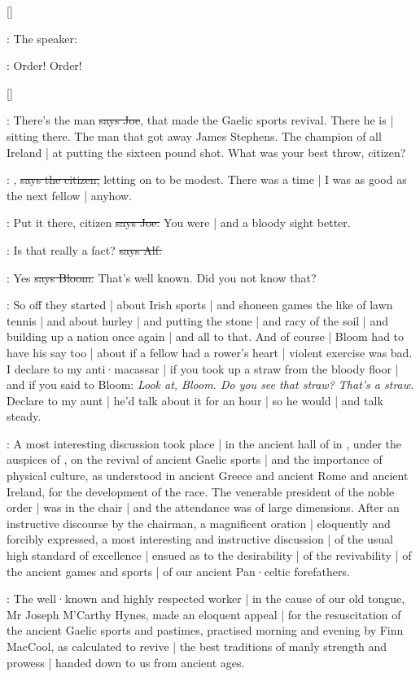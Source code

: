 []

:
The speaker:

\Speaker:
Order!
Order!

[]

\joe:
There's the man
\sout{says Joe},
that made the Gaelic sports revival.
There he is |
sitting there.
The man that got away James Stephens.
The champion of all Ireland |
at putting the sixteen pound shot.
What was your best throw,
citizen?

\citizen:
,
\sout{says the citizen,}
letting on to be modest.
There was a time |
I was as good as the next fellow |
anyhow.

\joe:
Put it there,
citizen
\sout{says Joe.}
You were |
and a bloody sight better.

\bergan:
Is that really a fact?
\sout{says Alf.}

\Bloom:
Yes
\sout{says Bloom.}
That's well known.
Did you not know that?

\Nq:
So off they started |
about Irish sports |
and shoneen games the like of lawn tennis |
and about hurley
 |
and putting the stone |
and racy of the soil |
and building up a nation once again |
and all to that.
And of course |
Bloom had to have his say too |
about if a fellow had a rower's heart |
violent exercise was bad.
I declare to my anti·macassar |
if you took up a straw from the bloody floor |
and if you said to Bloom:
\emph{Look at,
Bloom.
Do you see that straw?
That's a straw.}
Declare to my aunt |
he'd talk about it for an hour |
so he would |
and talk steady.

:
A most interesting discussion took place |
in the ancient hall of
in ,
under the auspices of ,
on the revival of ancient Gaelic sports |
and the importance of physical culture,
as understood in ancient Greece and ancient Rome and ancient Ireland,
for the development of the race.
The venerable president of the noble order |
was in the chair |
and the attendance was of large dimensions.
After an instructive discourse by the chairman,
a magnificent oration |
eloquently and forcibly expressed,
a most interesting and instructive discussion |
of the usual high standard of excellence |
ensued as to the desirability |
of the revivability |
of the ancient games and sports |
of our ancient Pan·celtic forefathers.

:
The well·known and highly respected worker |
in the cause of our old tongue,
Mr Joseph M'Carthy Hynes,
made an eloquent appeal |
for the resuscitation of the ancient Gaelic sports and pastimes,
practised morning and evening by Finn MacCool,
as calculated to revive |
the best traditions of manly strength and prowess |
handed down to us from ancient ages.

